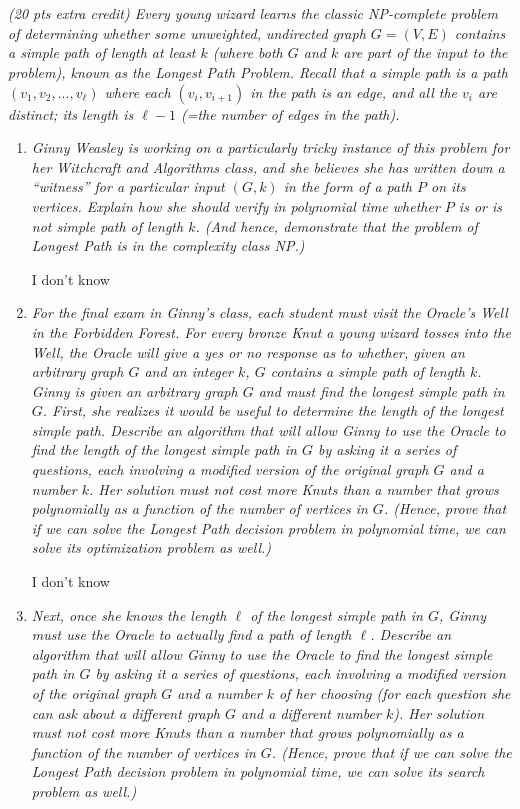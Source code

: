 \documentclass[12pt]{article} \setlength{\oddsidemargin}{0in}
\begin{document}
\section{} 
\textit{(20 pts extra credit) Every young wizard learns the classic NP-complete problem of determining whether some unweighted, undirected graph $G = (V,E)$ contains a simple path of length at least $k$ (where both $G$ and $k$ are part of the input to the problem), known as the Longest Path Problem. Recall that a simple path is a path $(v_1, v_2, ... , v_\ell)$ where each $(v_i, v_{i+1})$ in the path is an edge, and all the $v_i$ are distinct; its length is $\ell-1$ (=the number of edges in the path).}
\begin{enumerate}
\item\textit{Ginny Weasley is working on a particularly tricky instance of this problem for her Witchcraft and Algorithms class, and she believes she has written down a ``witness'' for a particular input $(G, k)$ in the form of a path $P$ on its vertices. Explain how she should verify in polynomial time whether $P$ is or is not simple path of length  $k$. (And hence, demonstrate that the problem of Longest Path is in the complexity class NP.)}

I don't know  
\item\textit{For the final exam in Ginny's class, each student must visit the Oracle's Well in the Forbidden Forest. For every bronze Knut a young wizard tosses into the Well, the Oracle will give a yes or no response as to whether, given an arbitrary graph $G$ and an integer $k$, $G$ contains a simple path of length  $k$. Ginny is given an arbitrary graph $G$ and must find the longest simple path in $G$. First, she realizes it would be useful to determine the length of the longest simple path. Describe an algorithm that will allow Ginny to use the Oracle to find the length of the longest simple path in $G$ by asking it a series of questions, each involving a modified version of the original graph $G$ and a number $k$. Her solution must not cost more Knuts than a number that grows polynomially as a function of the number of vertices in $G$. (Hence, prove that if we can solve the Longest Path decision problem in polynomial time, we can solve its optimization problem as well.)}

I don't know 

\item\textit{Next, once she knows the length $\ell$ of the longest simple path in $G$, Ginny must use the Oracle to actually find a path of length $\ell$. Describe an algorithm that will allow Ginny to use the Oracle to find the longest simple path in $G$ by asking it a series of questions, each involving a modified version of the original graph $G$ and a number $k$ of her choosing (for each question she can ask about a different graph $G$ and a different number $k$). Her solution must not cost more Knuts than a number that grows polynomially as a function of the number of vertices in $G$. (Hence, prove that if we can solve the Longest Path decision problem in polynomial time, we can solve its search problem as well.)}


\end{enumerate}
\end{document}
